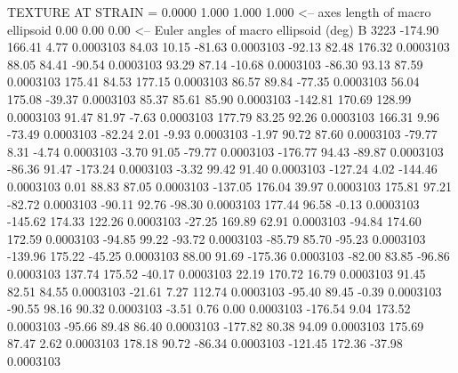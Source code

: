 TEXTURE AT STRAIN =    0.0000
   1.000   1.000   1.000  <-- axes length of macro ellipsoid
    0.00    0.00    0.00  <-- Euler angles of macro ellipsoid (deg)
B      3223
     -174.90      166.41        4.77     0.0003103
       84.03       10.15      -81.63     0.0003103
      -92.13       82.48      176.32     0.0003103
       88.05       84.41      -90.54     0.0003103
       93.29       87.14      -10.68     0.0003103
      -86.30       93.13       87.59     0.0003103
      175.41       84.53      177.15     0.0003103
       86.57       89.84      -77.35     0.0003103
       56.04      175.08      -39.37     0.0003103
       85.37       85.61       85.90     0.0003103
     -142.81      170.69      128.99     0.0003103
       91.47       81.97       -7.63     0.0003103
      177.79       83.25       92.26     0.0003103
      166.31        9.96      -73.49     0.0003103
      -82.24        2.01       -9.93     0.0003103
       -1.97       90.72       87.60     0.0003103
      -79.77        8.31       -4.74     0.0003103
       -3.70       91.05      -79.77     0.0003103
     -176.77       94.43      -89.87     0.0003103
      -86.36       91.47     -173.24     0.0003103
       -3.32       99.42       91.40     0.0003103
     -127.24        4.02     -144.46     0.0003103
        0.01       88.83       87.05     0.0003103
     -137.05      176.04       39.97     0.0003103
      175.81       97.21      -82.72     0.0003103
      -90.11       92.76      -98.30     0.0003103
      177.44       96.58       -0.13     0.0003103
     -145.62      174.33      122.26     0.0003103
      -27.25      169.89       62.91     0.0003103
      -94.84      174.60      172.59     0.0003103
      -94.85       99.22      -93.72     0.0003103
      -85.79       85.70      -95.23     0.0003103
     -139.96      175.22      -45.25     0.0003103
       88.00       91.69     -175.36     0.0003103
      -82.00       83.85      -96.86     0.0003103
      137.74      175.52      -40.17     0.0003103
       22.19      170.72       16.79     0.0003103
       91.45       82.51       84.55     0.0003103
      -21.61        7.27      112.74     0.0003103
      -95.40       89.45       -0.39     0.0003103
      -90.55       98.16       90.32     0.0003103
       -3.51        0.76        0.00     0.0003103
     -176.54        9.04      173.52     0.0003103
      -95.66       89.48       86.40     0.0003103
     -177.82       80.38       94.09     0.0003103
      175.69       87.47        2.62     0.0003103
      178.18       90.72      -86.34     0.0003103
     -121.45      172.36      -37.98     0.0003103
